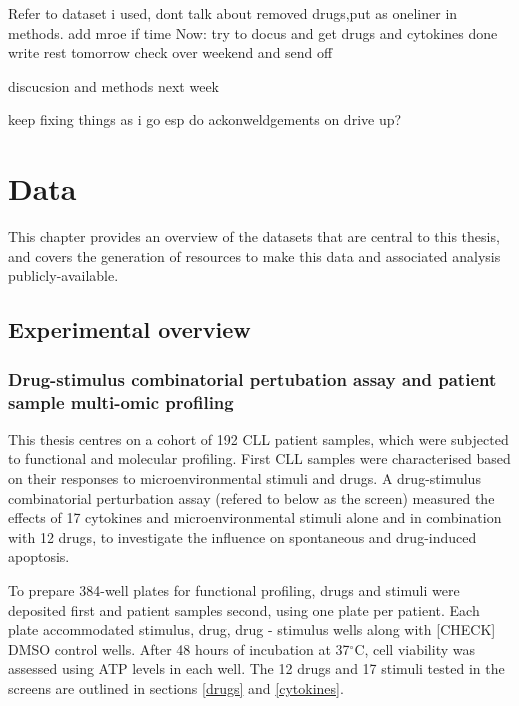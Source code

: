 \documentclass[11pt, a4paper, twosided]{book}
\begin{document}
Refer to dataset i used, dont talk about removed drugs,put as oneliner in methods. add mroe if time
Now:
try to docus and get drugs and cytokines done
write rest tomorrow
check over weekend and send off

discucsion and methods next week

keep fixing things as i go esp do ackonweldgements on drive up?

\hypertarget{data}{%
\chapter{Data}\label{data}}

This chapter provides an overview of the datasets that are central to this thesis, and covers the generation of resources to make this data and associated analysis publicly-available.

\hypertarget{experimental-overview}{%
\section{Experimental overview}\label{experimental-overview}}

\hypertarget{drug-stimulus-combinatorial-pertubation-assay-and-patient-sample-multi-omic-profiling}{%
\subsection{Drug-stimulus combinatorial pertubation assay and patient sample multi-omic profiling}\label{drug-stimulus-combinatorial-pertubation-assay-and-patient-sample-multi-omic-profiling}}

This thesis centres on a cohort of 192 CLL patient samples, which were subjected to functional and molecular profiling. First CLL samples were characterised based on their responses to microenvironmental stimuli and drugs.
A drug-stimulus combinatorial perturbation assay (refered to below as the screen) measured the effects of 17 cytokines and microenvironmental stimuli alone and in combination with 12 drugs, to investigate the influence on spontaneous and drug-induced apoptosis.

To prepare 384-well plates for functional profiling, drugs and stimuli were deposited first and patient samples second, using one plate per patient. Each plate accommodated stimulus, drug, drug - stimulus wells along with {[}CHECK{]} DMSO control wells. After 48 hours of incubation at 37\(^\circ\)C, cell viability was assessed using ATP levels in each well. The 12 drugs and 17 stimuli tested in the screens are outlined in sections \ref{drugs} and \ref{cytokines}.
\end{document}
